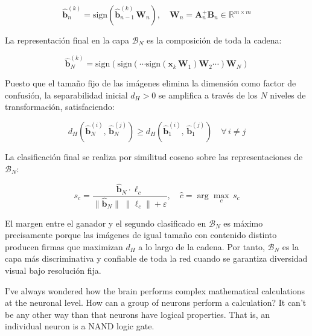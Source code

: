 \documentclass[12pt]{article}
\begin{document}
\begin{equation}
	\hat{\mathbf{b}}_n^{(k)} = \text{sign}\!\left(\hat{\mathbf{b}}_{n-1}^{(k)} \, \mathbf{W}_n\right),
	\quad \mathbf{W}_n = \mathbf{A}_n^{+} \mathbf{B}_n \in \mathbb{R}^{m \times m}
\end{equation}

La representación final en la capa $\mathcal{B}_N$ es la composición de toda la cadena:

\begin{equation}
	\hat{\mathbf{b}}_N^{(k)} = \text{sign}\!\left(
	\text{sign}\!\left( \cdots
	\text{sign}\!\left(\mathbf{x}_k \, \mathbf{W}_1\right)
	\mathbf{W}_2 \cdots \right)
	\mathbf{W}_N \right)
\end{equation}

Puesto que el tamaño fijo de las imágenes elimina la dimensión como factor de confusión,
la separabilidad inicial $d_H > 0$ se amplifica a través de los $N$ niveles de transformación,
satisfaciendo:

\begin{equation}
	d_H\!\left(\hat{\mathbf{b}}_N^{(i)},\, \hat{\mathbf{b}}_N^{(j)}\right)
	\geq d_H\!\left(\hat{\mathbf{b}}_1^{(i)},\, \hat{\mathbf{b}}_1^{(j)}\right)
	\quad \forall\, i \neq j
\end{equation}

La clasificación final se realiza por similitud coseno sobre las representaciones de $\mathcal{B}_N$:

\begin{equation}
	s_c = \frac{\hat{\mathbf{b}}_N \cdot \boldsymbol{\ell}_c}
	{\|\hat{\mathbf{b}}_N\| \; \|\boldsymbol{\ell}_c\| + \varepsilon},
	\quad \hat{c} = \arg\max_{c}\, s_c
\end{equation}

El margen entre el ganador y el segundo clasificado en $\mathcal{B}_N$ es máximo precisamente
porque las imágenes de igual tamaño con contenido distinto producen firmas que maximizan
$d_H$ a lo largo de la cadena. Por tanto, $\mathcal{B}_N$ es la capa más discriminativa
y confiable de toda la red cuando se garantiza diversidad visual bajo resolución fija.





I've always wondered how the brain performs complex mathematical calculations at the neuronal level. How can a group of neurons perform a calculation? It can't be any other way than that neurons have logical properties. That is, an individual neuron is a NAND logic gate.
\end{document}
